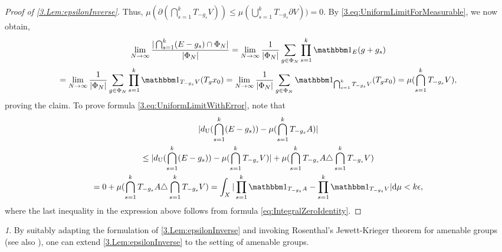 \documentclass[11pt,american,preprint]{elsarticle}
\numberwithin{equation}{section}
\theoremstyle{plain}
\theoremstyle{plain*}
\theoremstyle{plain}
\theoremstyle{plain*}
\theoremstyle{plain}
\theoremstyle{plain*}
\theoremstyle{remark}
\theoremstyle{remark*}
\theoremstyle{remark}
\newtheorem{rem}[thm]{\protect\remarkname}
\theoremstyle{remark*}
\theoremstyle{remark}
\theoremstyle{remark*}
\theoremstyle{plain}
\theoremstyle{definition}
\theoremstyle{plain}
\theoremstyle{plain} %
\providecommand{\remarkname}{Remark}
\begin{document}
\begin{proof}[Proof of \cref{3.Lem:epsilonInverse}]
 Thus, $\mu(\partial(\bigcap_{s=1}^k T_{-g_s}V))\leq \mu(\bigcup_{s=1}^k T_{-g_s}\partial V)) =0$. By \eqref{3.eq:UniformLimitForMeasurable}, we now obtain,
 \begin{multline*}
     \lim_{N\rightarrow\infty}\frac{|\bigcap_{s=1}^k(E-g_s)\cap \Phi_N|}{|\Phi_N|}=\lim_{N\rightarrow\infty}\frac{1}{|\Phi_N|}\sum_{g\in \Phi_N}\prod_{s=1}^k\mathbbm 1_E(g+g_s)\\
     =\lim_{N\rightarrow\infty}\frac{1}{|\Phi_N|}\sum_{g\in \Phi_N}\prod_{s=1}^k\mathbbm 1_{T_{-g_s}V}(T_gx_0)=\lim_{N\rightarrow\infty}\frac{1}{|\Phi_N|}\sum_{g\in \Phi_N}\mathbbm 1_{\bigcap_{s=1}^kT_{-g_s}V}(T_gx_0)=\mu(\bigcap_{s=1}^kT_{-g_s}V),
 \end{multline*}
 proving the claim. To prove formula \eqref{3.eq:UniformLimitWithError}, note that  
 \begin{multline*}
     |d_{{\rm U}}(\bigcap_{s=1}^k(E-g_s))- \mu(\bigcap_{s=1}^k T_{-g_s}A)|\\
     \leq |d_{{\rm U}}(\bigcap_{s=1}^k(E-g_s))- \mu(\bigcap_{s=1}^k T_{-g_s}V)|
    + \mu(\bigcap_{s=1}^k T_{-g_s}A\triangle \bigcap_{s=1}^k T_{-g_s}V)\\
    =0+  \mu(\bigcap_{s=1}^k T_{-g_s}A\triangle \bigcap_{s=1}^k T_{-g_s}V)
    =\int_X|\prod_{s=1}^k\mathbbm 1_{T_{-g_s}A}-\prod_{s=1}^k\mathbbm 1_{T_{-g_s}V}|\text{d}\mu<k\epsilon,
 \end{multline*}
 where the last inequality in the expression above follows from formula \eqref{eq:IntegralZeroIdentity}.
\end{proof}
\begin{rem}
    By suitably adapting the formulation of \cref{3.Lem:epsilonInverse} and invoking Rosenthal's Jewett-Krieger theorem for amenable groups \cite{RosenthalAmenableJewettKrieger} (see also \cite[Theorem 2]{Weiss2025JewettKrieger}), one can extend \cref{3.Lem:epsilonInverse} to the setting of amenable groups.
\end{rem}


\appendix
{}
\renewcommand{\thethm}{\Alph{section}\arabic{thm}}
\renewcommand{\thesubsection}{\Alph{section}.\arabic{subsection}}
\renewcommand{\thesection}{\Alph{section}}%
\end{document}
